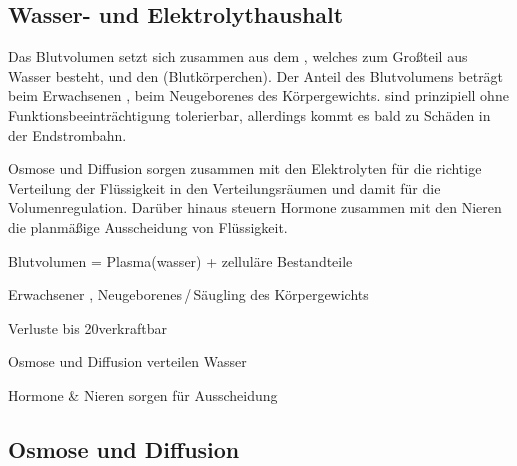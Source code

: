 \subsection{Wasser- und Elektrolythaushalt}
\label{topic:wasser-elektrolythaushalt}

{%
Das Blutvolumen setzt sich zusammen aus dem ,
welches zum Großteil aus Wasser besteht, und den
 (Blutkörperchen).
Der Anteil des Blutvolumens beträgt beim Erwachsenen
\PC*, beim Neugeborenes \PC* des Körpergewichts.
 sind prinzipiell ohne
Funktionsbeeinträchtigung tolerierbar, allerdings kommt es
bald zu Schäden in der Endstrombahn.

Osmose und Diffusion sorgen zusammen mit den Elektrolyten
für die richtige Verteilung der Flüssigkeit in den
Verteilungsräumen und damit für die Volumenregulation.
Darüber hinaus steuern
Hormone zusammen
mit den Nieren die planmäßige Ausscheidung von Flüssigkeit.
}{
\begin{compactitem}
  \item Blutvolumen = Plasma(wasser) + zelluläre Bestandteile
  \item Erwachsener \PC*, Neugeborenes\,/\,Säugling \PC* des Körpergewichts
  \item Verluste bis 20\PC* verkraftbar
  \item Osmose und Diffusion verteilen Wasser
  \item Hormone {\&} Nieren sorgen für Ausscheidung
\end{compactitem}
}
{}{}{}









\subsection{Osmose und Diffusion}
\label{topic:osmose}
\label{topic:diffusion}

